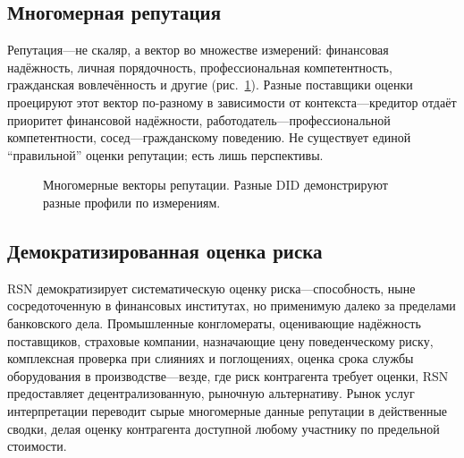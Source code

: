 \documentclass[11pt,a4paper,twocolumn]{article}
\begin{document}
\subsection{Многомерная репутация}

Репутация---не скаляр, а вектор во множестве измерений: финансовая надёжность, личная порядочность, профессиональная компетентность, гражданская вовлечённость и другие (рис.~\ref{fig:reputation-radar}). Разные поставщики оценки проецируют этот вектор по-разному в зависимости от контекста---кредитор отдаёт приоритет финансовой надёжности, работодатель---профессиональной компетентности, сосед---гражданскому поведению. Не существует единой ``правильной'' оценки репутации; есть лишь перспективы.

\begin{figure}[ht]
\centering
{}
\caption{Многомерные векторы репутации. Разные DID демонстрируют разные профили по измерениям.}
\label{fig:reputation-radar}
\end{figure}

\subsection{Демократизированная оценка риска}

RSN демократизирует систематическую оценку риска---способность, ныне сосредоточенную в финансовых институтах, но применимую далеко за пределами банковского дела. Промышленные конгломераты, оценивающие надёжность поставщиков, страховые компании, назначающие цену поведенческому риску, комплексная проверка при слияниях и поглощениях, оценка срока службы оборудования в производстве---везде, где риск контрагента требует оценки, RSN предоставляет децентрализованную, рыночную альтернативу. Рынок услуг интерпретации переводит сырые многомерные данные репутации в действенные сводки, делая оценку контрагента доступной любому участнику по предельной стоимости.
\end{document}
